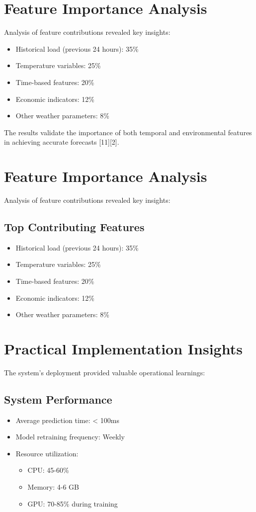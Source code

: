 \documentclass[12pt,a4paper]{report}
\begin{document}
\section{Feature Importance Analysis}
Analysis of feature contributions revealed key insights:

\begin{itemize}
\item Historical load (previous 24 hours): 35\%
\item Temperature variables: 25\%
\item Time-based features: 20\%
\item Economic indicators: 12\%
\item Other weather parameters: 8\%
\end{itemize}

The results validate the importance of both temporal and environmental features in achieving accurate forecasts [11][2].

\section{Feature Importance Analysis}
Analysis of feature contributions revealed key insights:

\subsection{Top Contributing Features}
\begin{itemize}
\item Historical load (previous 24 hours): 35\%
\item Temperature variables: 25\%
\item Time-based features: 20\%
\item Economic indicators: 12\%
\item Other weather parameters: 8\%
\end{itemize}

\section{Practical Implementation Insights}
The system's deployment provided valuable operational learnings:

\subsection{System Performance}
\begin{itemize}
\item Average prediction time: < 100ms
\item Model retraining frequency: Weekly
\item Resource utilization: 
  \begin{itemize}
    \item CPU: 45-60\%
    \item Memory: 4-6 GB
    \item GPU: 70-85\% during training
  \end{itemize}
\end{itemize}
\end{document}

